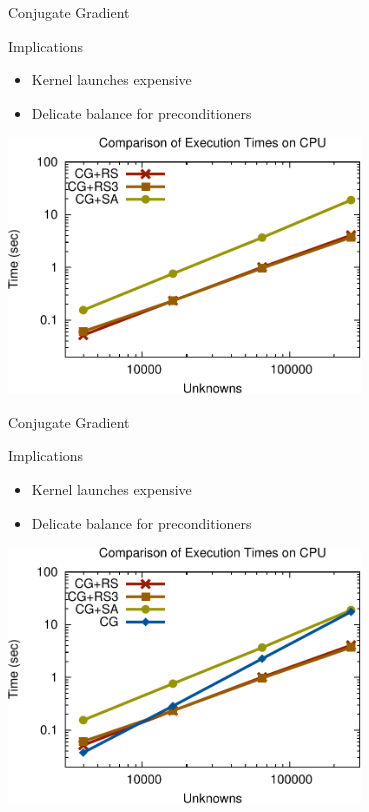 \begin{frame}[fragile]{Conjugate Gradient}

 \begin{block}{Implications}
   \begin{itemize}
   \item Kernel launches expensive
   \item Delicate balance for preconditioners
  \end{itemize}
  
  \begin{center}
   \includegraphics[width=0.7\textwidth]{figures/cpu_scaling-1}
  \end{center}
 \end{block}
   
\end{frame}


\begin{frame}[fragile]{Conjugate Gradient}

 \begin{block}{Implications}
   \begin{itemize}
   \item Kernel launches expensive
   \item Delicate balance for preconditioners
  \end{itemize}
  
  \begin{center}
   \includegraphics[width=0.7\textwidth]{figures/cpu_scaling-2}
  \end{center}
 \end{block}
   
\end{frame}

